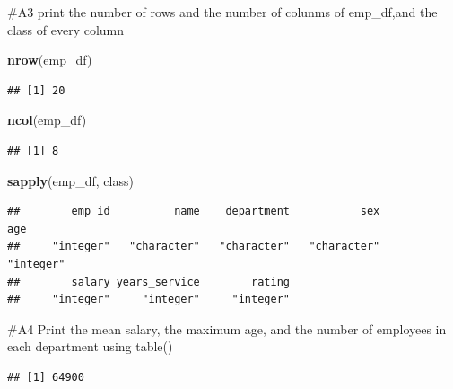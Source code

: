 \documentclass[
]{article}
\newenvironment{Shaded}{\begin{snugshade}}{\end{snugshade}}
\newcommand{\FunctionTok}[1]{\textcolor[rgb]{0.13,0.29,0.53}{\textbf{#1}}}
\newcommand{\NormalTok}[1]{#1}
\newcommand{\SpecialCharTok}[1]{\textcolor[rgb]{0.81,0.36,0.00}{\textbf{#1}}}
\begin{document}
\#A3 print the number of rows and the number of colunms of emp\_df,and
the class of every column

\begin{Shaded}
\begin{Highlighting}[]
\FunctionTok{nrow}\NormalTok{(emp\_df)}
\end{Highlighting}
\end{Shaded}

\begin{verbatim}
## [1] 20
\end{verbatim}

\begin{Shaded}
\begin{Highlighting}[]
\FunctionTok{ncol}\NormalTok{(emp\_df)}
\end{Highlighting}
\end{Shaded}

\begin{verbatim}
## [1] 8
\end{verbatim}

\begin{Shaded}
\begin{Highlighting}[]
\FunctionTok{sapply}\NormalTok{(emp\_df, class)}
\end{Highlighting}
\end{Shaded}

\begin{verbatim}
##        emp_id          name    department           sex           age 
##     "integer"   "character"   "character"   "character"     "integer" 
##        salary years_service        rating 
##     "integer"     "integer"     "integer"
\end{verbatim}

\#A4 Print the mean salary, the maximum age, and the number of employees
in each department using table()

\begin{Shaded}
\end{Shaded}

\begin{verbatim}
## [1] 64900
\end{verbatim}

\begin{Shaded}
\end{Shaded}
\end{document}
